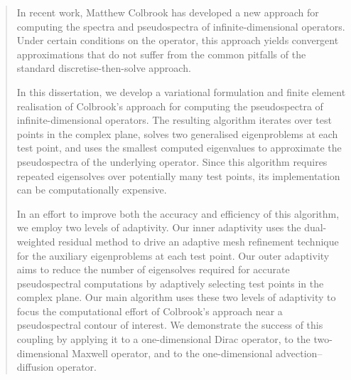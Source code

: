 \begin{abstract}



In recent work, Matthew Colbrook has developed a new approach for computing the spectra and pseudospectra of infinite-dimensional operators. Under certain conditions on the operator, this approach yields convergent approximations that do not suffer from the common pitfalls of the standard discretise-then-solve approach.

In this dissertation, we develop a variational formulation and finite element realisation of Colbrook's approach for computing the pseudospectra of infinite-dimensional operators. The resulting algorithm iterates over test points in the complex plane, solves two generalised eigenproblems at each test point, and uses the smallest computed eigenvalues to approximate the pseudospectra of the underlying operator. Since this algorithm requires repeated eigensolves over potentially many test points, its implementation can be computationally expensive. 





In an effort to improve both the accuracy and efficiency of this algorithm, we employ two levels of adaptivity. Our inner adaptivity uses the dual-weighted residual method to drive an adaptive mesh refinement technique for the auxiliary eigenproblems at each test point. Our outer adaptivity aims to reduce the number of eigensolves required for accurate pseudospectral computations by adaptively selecting test points in the complex plane. Our main algorithm uses these two levels of adaptivity to focus the computational effort of Colbrook's approach near a pseudospectral contour of interest. We demonstrate the success of this coupling by applying it to a one-dimensional Dirac operator, to the two-dimensional Maxwell operator, and to the one-dimensional advection--diffusion operator.


\end{abstract}
